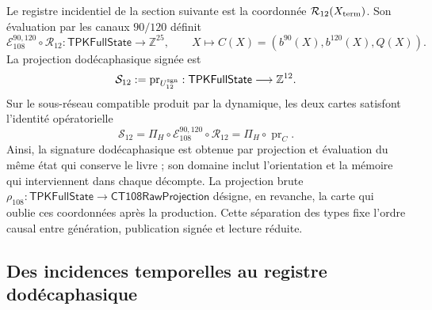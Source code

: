 Le registre incidentiel de la section suivante est la coordonnée
\(\mathcal R_{12}(X_{\rm term})\). Son évaluation par les canaux
\(90/120\) définit
\[
 \mathcal E_{108}^{90,120}\circ\mathcal R_{12}:
 \mathsf{TPKFullState}\longrightarrow\mathbb Z^{25},
 \qquad
 X\longmapsto C(X)=(b^{90}(X),b^{120}(X),Q(X)).
\]
La projection dodécaphasique signée est
\[
 \mathcal S_{12}:=\operatorname{pr}_{U_{12}^{\rm sgn}}:
 \mathsf{TPKFullState}\longrightarrow\mathbb Z^{12}.
\]
Sur le sous-réseau compatible produit par la dynamique, les deux cartes
satisfont l'identité opératorielle
\begin{equation}
 \mathcal S_{12}
 =\Pi_H\circ\mathcal E_{108}^{90,120}\circ\mathcal R_{12}
 =\Pi_H\circ\operatorname{pr}_{C}.
 \label{vi:vi:dep:identidad-productor-e108}
\end{equation}
Ainsi, la signature dodécaphasique est obtenue par projection et évaluation du même
état qui conserve le livre ; son domaine inclut l'orientation et la mémoire
qui interviennent dans chaque décompte. La projection brute
\(\rho_{108}:\mathsf{TPKFullState}\to\mathsf{CT108RawProjection}\)
désigne, en revanche, la carte qui oublie ces coordonnées après la
production. Cette séparation des types fixe l'ordre causal entre génération,
publication signée et lecture réduite.

\subsection{Des incidences temporelles au registre dodécaphasique}
\label{vi:vi:dep:registro}\label{vi:subsec:k-registro-integral}


